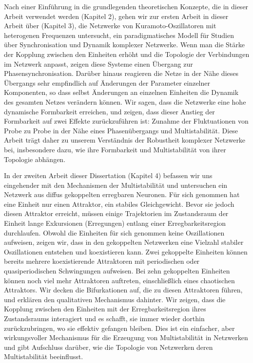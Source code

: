 Nach einer Einführung in die grundlegenden theoretischen Konzepte, die in dieser Arbeit verwendet werden (Kapitel 2), gehen wir zur ersten Arbeit in dieser Arbeit über (Kapitel 3), die Netzwerke von Kuramoto-Oszillatoren mit heterogenen Frequenzen untersucht, ein paradigmatisches Modell für Studien über Synchronisation und Dynamik komplexer Netzwerke. Wenn man die Stärke der Kopplung zwischen den Einheiten erhöht und die Topologie der Verbindungen im Netzwerk anpasst, zeigen diese Systeme einen Übergang zur Phasensynchronisation. Darüber hinaus reagieren die Netze in der Nähe dieses Übergangs sehr empfindlich auf Änderungen der Parameter einzelner Komponenten, so dass selbst Änderungen an einzelnen Einheiten die Dynamik des gesamten Netzes verändern können. Wir sagen, dass die Netzwerke eine hohe dynamische Formbarkeit erreichen, und zeigen, dass dieser Anstieg der Formbarkeit auf zwei Effekte zurückzuführen ist: Zunahme der Fluktuationen von Probe zu Probe in der Nähe eines Phasenübergangs und Multistabilität. Diese Arbeit trägt daher zu unserem Verständnis der Robustheit komplexer Netzwerke bei, insbesondere dazu, wie ihre Formbarkeit und Multistabilität von ihrer Topologie abhängen. 

In der zweiten Arbeit dieser Dissertation (Kapitel 4) befassen wir uns eingehender mit den Mechanismen der Multistabilität und untersuchen ein Netzwerk aus diffus gekoppelten erregbaren Neuronen. Für sich genommen hat eine Einheit nur einen Attraktor, ein stabiles Gleichgewicht. Bevor sie jedoch diesen Attraktor erreicht, müssen einige Trajektorien im Zustandsraum der Einheit lange Exkursionen (Erregungen) entlang einer Erregbarkeitsregion durchlaufen. Obwohl die Einheiten für sich genommen keine Oszillationen aufweisen, zeigen wir, dass in den gekoppelten Netzwerken eine Vielzahl stabiler Oszillationen entstehen und koexistieren kann. Zwei gekoppelte Einheiten können bereits mehrere koexistierende Attraktoren mit periodischen oder quasiperiodischen Schwingungen aufweisen. Bei zehn gekoppelten Einheiten können noch viel mehr Attraktoren auftreten, einschließlich eines chaotischen Attraktors. Wir decken die Bifurkationen auf, die zu diesen Attraktoren führen, und erklären den qualitativen Mechanismus dahinter. Wir zeigen, dass die Kopplung zwischen den Einheiten mit der Erregbarkeitsregion ihres Zustandsraums interagiert und es schafft, sie immer wieder dorthin zurückzubringen, wo sie effektiv gefangen bleiben. Dies ist ein einfacher, aber wirkungsvoller Mechanismus für die Erzeugung von Multistabilität in Netzwerken und gibt Aufschluss darüber, wie die Topologie von Netzwerken deren Multistabilität beeinflusst. 


